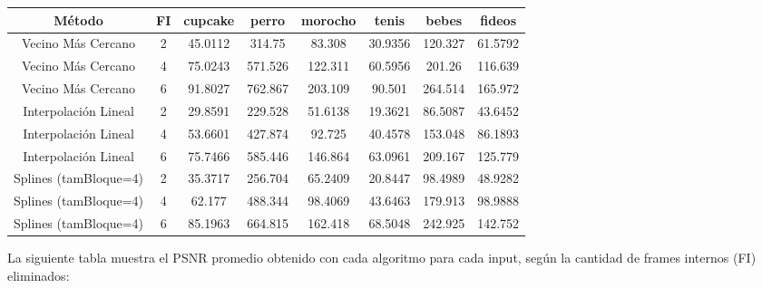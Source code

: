 \bigskip
{}
\begin{tabular}{| c | c | c | c | c | c | c | c |} 
\hline
\textbf{Método} & \textbf{FI} & \textbf{cupcake} & \textbf{perro} & \textbf{morocho} & \textbf{tenis} & \textbf{bebes} & \textbf{fideos} \\ 
\hline
Vecino Más Cercano & 2 & 45.0112 & 314.75 & 83.308 & 30.9356 & 120.327 & 61.5792 \\ 
\hline
Vecino Más Cercano & 4 & 75.0243 & 571.526 & 122.311 & 60.5956 & 201.26 & 116.639 \\ 
\hline
Vecino Más Cercano & 6 & 91.8027 & 762.867 & 203.109 & 90.501 & 264.514 & 165.972 \\ 
\hline
Interpolación Lineal & 2 & 29.8591 & 229.528 & 51.6138 & 19.3621 & 86.5087 & 43.6452 \\ 
\hline
Interpolación Lineal & 4 & 53.6601 & 427.874 & 92.725 & 40.4578 & 153.048 & 86.1893 \\ 
\hline
Interpolación Lineal & 6 & 75.7466 & 585.446 & 146.864 & 63.0961 & 209.167 & 125.779 \\ 
\hline
Splines (tamBloque=4) & 2 & 35.3717 & 256.704 & 65.2409 & 20.8447 & 98.4989 & 48.9282 \\ 
\hline
Splines (tamBloque=4) & 4 & 62.177 & 488.344 & 98.4069 & 43.6463 & 179.913 & 98.9888 \\ 
\hline
Splines (tamBloque=4) & 6 & 85.1963 & 664.815 & 162.418 & 68.5048 & 242.925 & 142.752 \\ 
\hline
\end{tabular}

\bigskip

La siguiente tabla muestra el PSNR promedio obtenido con cada algoritmo para cada input, según la cantidad de frames internos (FI) eliminados:

\bigskip

